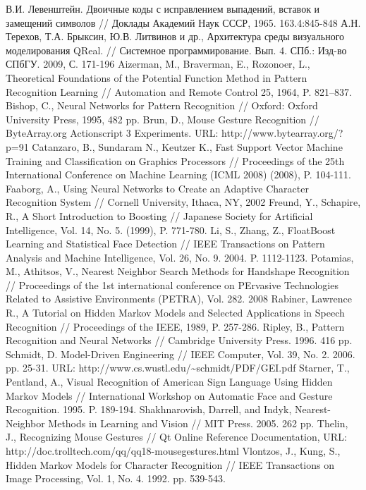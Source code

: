 \documentclass[a5paper]{article}
\begin{document}
\pagebreak

\begin{thebibliography}{9001}
   В.И. Левенштейн. Двоичные коды с исправлением выпадений, вставок и замещений символов // Доклады Академий Наук СССР, 1965. 163.4:845-848
   А.Н. Терехов, Т.А. Брыксин, Ю.В. Литвинов и др., Архитектура среды визуального моделирования QReal. // Системное программирование. Вып. 4. СПб.: Изд-во СПбГУ. 2009, С. 171-196
   Aizerman, M., Braverman, E., Rozonoer, L., Theoretical Foundations of the Potential Function Method in Pattern Recognition Learning // Automation and Remote Control 25, 1964, P. 821–837.
   Bishop, C., Neural Networks for Pattern Recognition // Oxford: Oxford University Press, 1995, 482 pp.
   Brun, D., Mouse Gesture Recognition // ByteArray.org Actionscript 3 Experiments. URL: http://www.bytearray.org/?p=91 
   Catanzaro, B., Sundaram N., Keutzer K., Fast Support Vector Machine Training and Classification on Graphics Processors // Proceedings of the 25th International Conference on Machine Learning (ICML 2008) (2008), P. 104-111.
	 Faaborg, A., Using Neural Networks to Create an Adaptive Character Recognition System // Cornell University, Ithaca, NY, 2002
   Freund, Y., Schapire, R., A Short Introduction to Boosting // Japanese Society for Artificial Intelligence, Vol. 14, No. 5. (1999), P. 771-780.
   Li, S., Zhang, Z., FloatBoost Learning and Statistical Face Detection // IEEE Transactions on Pattern Analysis and Machine Intelligence, Vol. 26, No. 9. 2004. P. 1112-1123.
   Potamias, M., Athitsos, V., Nearest Neighbor Search Methods for Handshape Recognition // Proceedings of the 1st international conference on PErvasive Technologies Related to Assistive Environments (PETRA), Vol. 282. 2008
   Rabiner, Lawrence R., A Tutorial on Hidden Markov Models and Selected Applications in Speech Recognition // Proceedings of the IEEE, 1989, P. 257-286.
   Ripley, B., Pattern Recognition and Neural Networks // Cambridge University Press. 1996. 416 pp.
	 Schmidt, D. Model-Driven Engineering // IEEE Computer, Vol. 39, No. 2. 2006. pp. 25-31. URL: http://www.cs.wustl.edu/\textasciitilde schmidt/PDF/GEI.pdf
   Starner, T., Pentland, A., Visual Recognition of American Sign Language Using Hidden Markov Models // International Workshop on Automatic Face and Gesture Recognition. 1995. P. 189-194.
   Shakhnarovish, Darrell, and Indyk, Nearest-Neighbor Methods in Learning and Vision // MIT Press. 2005. 262 pp.
   Thelin, J., Recognizing Mouse Gestures // Qt Online Reference Documentation, URL: http://doc.trolltech.com/qq/qq18-mousegestures.html 
   Vlontzos, J., Kung, S., Hidden Markov Models for Character Recognition // IEEE Transactions on Image Processing, Vol. 1, No. 4. 1992. pp. 539-543.
\end{thebibliography}  
\end{document}
